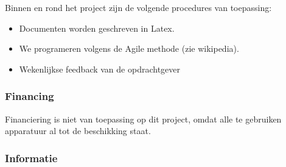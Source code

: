 Binnen en rond het project zijn de volgende procedures van toepassing:

\begin{itemize}
    \item Documenten worden geschreven in Latex.
    \item We programeren volgens de Agile methode (zie wikipedia).
    \item Wekenlijkse feedback van de opdrachtgever
\end{itemize}

\subsubsection{Financing}

Financiering is niet van toepassing op dit project, omdat alle te gebruiken apparatuur al tot de beschikking staat.

\subsubsection{Informatie}





